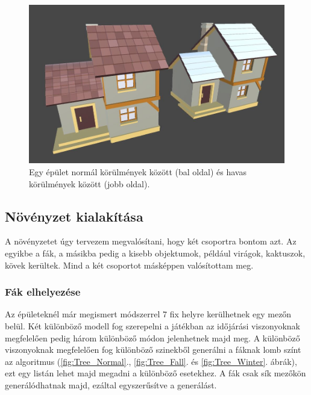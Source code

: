 \begin{figure}[h!]
\centering
\includegraphics[scale=0.25]{kepek/Buildings.JPG}
\caption[épület]{Egy épület normál körülmények között (bal oldal) és havas körülmények között (jobb oldal). \footnotemark}
\label{fig:Buildings}
\end{figure}


\subsection{Növényzet kialakítása}

A növényzetet úgy tervezem megvalósítani, hogy két csoportra bontom azt. Az egyikbe a fák, a másikba pedig a kisebb objektumok, például virágok, kaktuszok, kövek kerültek. Mind a két csoportot másképpen valósítottam meg.

\subsubsection{Fák elhelyezése}

Az épületeknél már megismert módszerrel 7 fix helyre kerülhetnek egy mezőn belül. Két különböző modell fog szerepelni a játékban az időjárási viszonyoknak megfelelően pedig három különböző módon jelenhetnek majd meg. A különböző viszonyoknak megfelelően fog különböző szinekből generálni a fáknak lomb színt az algoritmus (\ref{fig:Tree_Normal}., \ref{fig:Tree_Fall}. és \ref{fig:Tree_Winter}. ábrák), ezt egy listán lehet majd megadni a különböző esetekhez. A fák csak sík mezőkön generálódhatnak majd, ezáltal egyszerűsítve a generálást.

